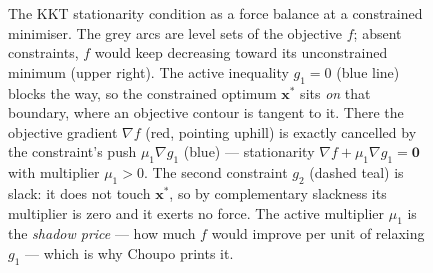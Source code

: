 \documentclass[11pt,a4paper]{article}
\newcommand{\xv}{\mathbf{x}}
\begin{document}
\begin{figure}[ht]
\centering
{}
\caption{The KKT stationarity condition as a force balance at a
constrained minimiser.  The grey arcs are level sets of the objective
$f$; absent constraints, $f$ would keep decreasing toward its
unconstrained minimum (upper right).  The active inequality $g_1=0$
(blue line) blocks the way, so the constrained optimum $\xv^{\!*}$ sits
\emph{on} that boundary, where an objective contour is tangent to it.
There the objective gradient $\nabla f$ (red, pointing uphill) is
exactly cancelled by the constraint's push $\mu_1\nabla g_1$ (blue) ---
stationarity $\nabla f+\mu_1\nabla g_1=\mathbf 0$ with multiplier
$\mu_1>0$.  The second constraint $g_2$ (dashed teal) is slack: it does
not touch $\xv^{\!*}$, so by complementary slackness its multiplier is
zero and it exerts no force.  The active multiplier $\mu_1$ is the
\emph{shadow price} --- how much $f$ would improve per unit of relaxing
$g_1$ --- which is why Choupo prints it.}
\label{fig:kkt-geometry}
\end{figure}
\end{document}
